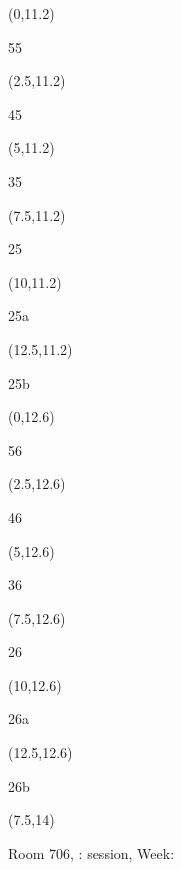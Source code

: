 \documentclass[a4paper]{article}
\newcommand{\myseat}[4]{%
	\vspace{0.1cm}
	\parbox[t][2.5cm][t]{3.5cm}{
	\small #1 %
	\begin{description}
	\vspace{-0.1cm}
	\item [ID:] #2
	\vspace{-0.1cm}
	\item [Team:] #3 \normalsize
	\vspace{-0.1cm}
	\item \normalsize #4
	\vspace{-0.1cm}
	\end{description}
	}
}
\begin{document}
\begin{textblock}{2.5}(0,11.2)
\textblockcolor{}
\myseat{55}{}{}{}
\end{textblock}

\begin{textblock}{2.5}(2.5,11.2)
\textblockcolor{}
\myseat{45}{}{}{}
\end{textblock}

\begin{textblock}{2.5}(5,11.2)
\textblockcolor{}
\myseat{35}{}{}{}
\end{textblock}

\begin{textblock}{2.5}(7.5,11.2)
\textblockcolor{}
\myseat{25}{}{}{}
\end{textblock}

\begin{textblock}{2.5}(10,11.2)
\textblockcolor{}
\myseat{25a}{}{}{}
\end{textblock}

\begin{textblock}{2.5}(12.5,11.2)
\textblockcolor{}
\myseat{25b}{}{}{}
\end{textblock}

\begin{textblock}{2.5}(0,12.6)
\textblockcolor{}
\myseat{56}{}{}{}
\end{textblock}

\begin{textblock}{2.5}(2.5,12.6)
\textblockcolor{}
\myseat{46}{}{}{}
\end{textblock}

\begin{textblock}{2.5}(5,12.6)
\textblockcolor{}
\myseat{36}{}{}{}
\end{textblock}

\begin{textblock}{2.5}(7.5,12.6)
\textblockcolor{}
\myseat{26}{}{}{}
\end{textblock}

\begin{textblock}{2.5}(10,12.6)
\textblockcolor{}
\myseat{26a}{}{}{}
\end{textblock}

\begin{textblock}{2.5}(12.5,12.6)
\textblockcolor{}
\myseat{26b}{}{}{}
\end{textblock}

\begin{textblock}{7.5}(7.5,14)
\textblockcolor{}
\parbox[t][2.2cm][t]{9.5cm}{%
\large Room 706, :  session, Week: 
}
\end{textblock}
\end{document}

